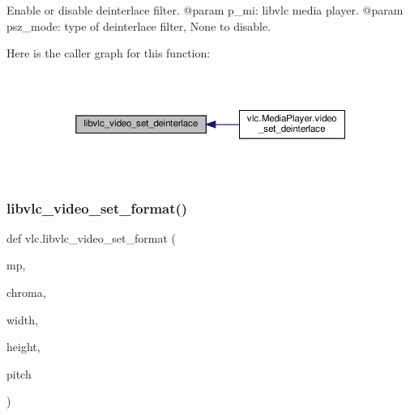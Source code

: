 \begin{DoxyVerb}Enable or disable deinterlace filter.
@param p_mi: libvlc media player.
@param psz_mode: type of deinterlace filter, None to disable.
\end{DoxyVerb}
 Here is the caller graph for this function\+:
\nopagebreak
\begin{figure}[H]
\begin{center}
\leavevmode
\includegraphics[width=350pt]{namespacevlc_a32c28e8b47f625bc8dc4a3634548fe65_icgraph}
\end{center}
\end{figure}
\mbox{\label{namespacevlc_acb41fcc3e8fb44271b3af9cfa0899473}} 
\subsubsection{\texorpdfstring{libvlc\+\_\+video\+\_\+set\+\_\+format()}{libvlc\_video\_set\_format()}}
{\footnotesize\ttfamily def vlc.\+libvlc\+\_\+video\+\_\+set\+\_\+format (\begin{DoxyParamCaption}\item[{}]{mp,  }\item[{}]{chroma,  }\item[{}]{width,  }\item[{}]{height,  }\item[{}]{pitch }\end{DoxyParamCaption})}


